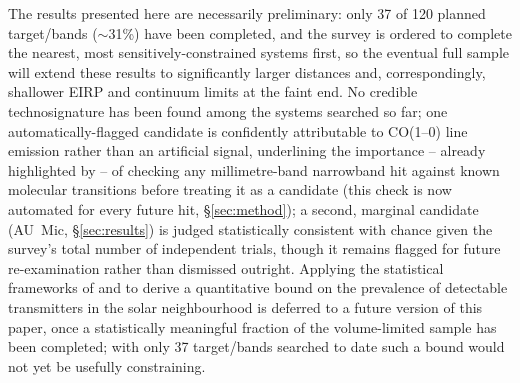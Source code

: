 \documentclass{openjournal}
\begin{document}
The results presented here are necessarily preliminary: only 37 of 120
planned target/bands ($\sim$31\%) have been completed, and the survey is
ordered to complete the nearest, most sensitively-constrained systems
first, so the eventual full sample will extend these results to
significantly larger distances and, correspondingly, shallower EIRP and
continuum limits at the faint end. No credible technosignature has been
found among the systems searched so far; one automatically-flagged
candidate is confidently attributable to CO(1--0) line emission rather
than an artificial signal, underlining the importance -- already
highlighted by \citet{Mason2024} -- of checking any millimetre-band
narrowband hit against known molecular transitions before treating it as
a candidate (this check is now automated for every future hit,
\S\ref{sec:method}); a second, marginal candidate (AU~Mic,
\S\ref{sec:results}) is judged statistically consistent with chance
given the survey's total number of independent trials, though it remains
flagged for future re-examination rather than dismissed outright.
Applying the statistical frameworks of
\citet{Wright2018} and \citet{Margot2023} to derive a quantitative bound
on the prevalence of detectable transmitters in the solar neighbourhood
is deferred to a future version of this paper, once a statistically
meaningful fraction of the volume-limited sample has been completed;
with only 37 target/bands searched to date such a bound would not yet be
usefully constraining.
\end{document}
